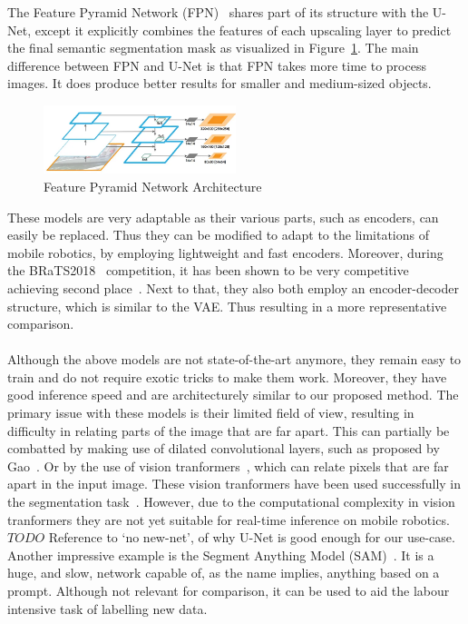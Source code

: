 The Feature Pyramid Network (FPN)~\cite{lin2017feature} shares part of its structure with the U-Net, except it explicitly combines the features of each upscaling layer to predict the final semantic segmentation mask as visualized in Figure~\ref{fig:fpn-architecture}. The main difference between FPN and U-Net is that FPN takes more time to process images. It does produce better results for smaller and medium-sized objects.

\begin{figure}[ht]
    \centering
    \includegraphics[width=0.5\textwidth]{figures/fpn-architecture.png}
    \caption{Feature Pyramid Network Architecture~\cite{lin2017feature}}
    \label{fig:fpn-architecture}
\end{figure}

These models are very adaptable as their various parts, such as encoders, can easily be replaced. Thus they can be modified to adapt to the limitations of mobile robotics, by employing lightweight and fast encoders. Moreover, during the BRaTS2018~\cite{menze2014multimodal} competition, it has been shown to be very competitive achieving second place~\cite{DBLP:journals/corr/abs-1809-10483}. Next to that, they also both employ an encoder-decoder structure, which is similar to the VAE. Thus resulting in a more representative comparison.

\paragraph{}
Although the above models are not state-of-the-art anymore, they remain easy to train and do not require exotic tricks to make them work. Moreover, they have good inference speed and are architecturely similar to our proposed method. The primary issue with these models is their limited field of view, resulting in difficulty in relating parts of the image that are far apart. This can partially be combatted by making use of dilated convolutional layers, such as proposed by Gao~\cite{gao2023rethinking}. Or by the use of vision tranformers~\cite{dosovitskiy2021image}, which can relate pixels that are far apart in the input image. These vision tranformers have been used successfully in the segmentation task~\cite{xie2021segformer,chen2022vision}. However, due to the computational complexity in vision tranformers they are not yet suitable for real-time inference on mobile robotics. $TODO$ Reference to `no new-net', of why U-Net is good enough for our use-case.
Another impressive example is the Segment Anything Model (SAM)~\cite{kirillov2023segment}. It is a huge, and slow, network capable of, as the name implies, anything based on a prompt. Although not relevant for comparison, it can be used to aid the labour intensive task of labelling new data.

